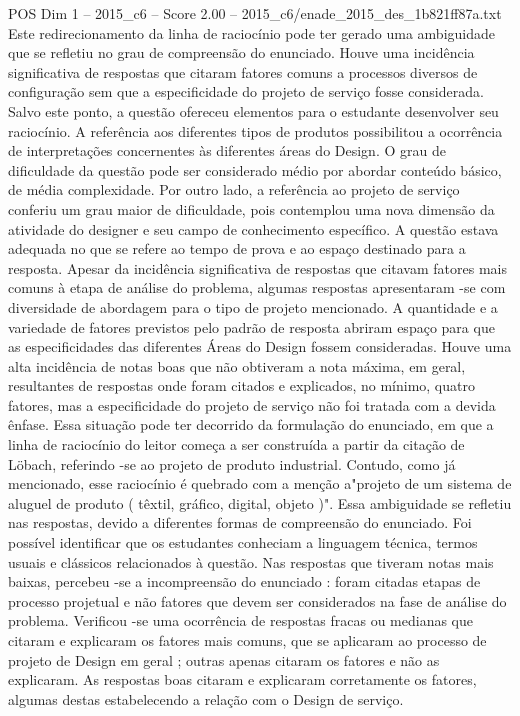 \begin{textsample}{POS Dim 1 – 2015\_c6 – Score 2.00 – 2015\_c6/enade\_2015\_des\_1b821ff87a.txt}
Este redirecionamento da linha de raciocínio pode ter gerado uma ambiguidade que se refletiu no grau de compreensão do enunciado.
Houve uma incidência significativa de respostas que citaram fatores comuns a processos diversos de configuração sem que a especificidade do projeto de serviço fosse considerada.
Salvo este ponto, a questão ofereceu elementos para o estudante desenvolver seu raciocínio.
A referência aos diferentes tipos de produtos possibilitou a ocorrência de interpretações concernentes às diferentes áreas do Design.
O grau de dificuldade da questão pode ser considerado médio por abordar conteúdo básico, de média complexidade.
Por outro lado, a referência ao projeto de serviço conferiu um grau maior de dificuldade, pois contemplou uma nova dimensão da atividade do designer e seu campo de conhecimento específico.
A questão estava adequada no que se refere ao tempo de prova e ao espaço destinado para a resposta.
Apesar da incidência significativa de respostas que citavam fatores mais comuns à etapa de análise do problema, algumas respostas apresentaram -se com diversidade de abordagem para o tipo de projeto mencionado.
A quantidade e a variedade de fatores previstos pelo padrão de resposta abriram espaço para que as especificidades das diferentes Áreas do Design fossem consideradas.
Houve uma alta incidência de notas boas que não obtiveram a nota máxima, em geral, resultantes de respostas onde foram citados e explicados, no mínimo, quatro fatores, mas a especificidade do projeto de serviço não foi tratada com a devida ênfase.
Essa situação pode ter decorrido da formulação do enunciado, em que a linha de raciocínio do leitor começa a ser construída a partir da citação de Löbach, referindo -se ao projeto de produto industrial.
Contudo, como já mencionado, esse raciocínio é quebrado com a menção a"projeto de um sistema de aluguel de produto ( têxtil, gráfico, digital, objeto )".
Essa ambiguidade se refletiu nas respostas, devido a diferentes formas de compreensão do enunciado.
Foi possível identificar que os estudantes conheciam a linguagem técnica, termos usuais e clássicos relacionados à questão.
Nas respostas que tiveram notas mais baixas, percebeu -se a incompreensão do enunciado : foram citadas etapas de processo projetual e não fatores que devem ser considerados na fase de análise do problema.
Verificou -se uma ocorrência de respostas fracas ou medianas que citaram e explicaram os fatores mais comuns, que se aplicaram ao processo de projeto de Design em geral ; outras apenas citaram os fatores e não as explicaram.
As respostas boas citaram e explicaram corretamente os fatores, algumas destas estabelecendo a relação com o Design de serviço.

\end{textsample}
